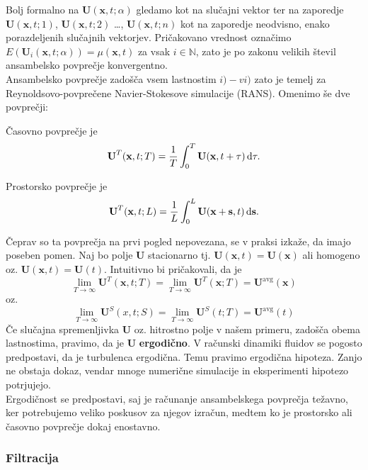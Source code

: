 \documentclass[mat2, tisk]{fmfdelo}
\newcommand{\N}{\mathbb N}
\newcommand{\bd}{\textbf}
\begin{document}
Bolj formalno na $\bd{U}(\bd{x}, t;\alpha)$ gledamo kot na slučajni vektor ter na zaporedje 
$\bd{U}(\bd{x}, t; 1)$, $\bd{U}(\bd{x}, t; 2)$ \dots, $\bd{U}(\bd{x}, t;n)$ kot na zaporedje neodvisno, enako porazdeljenih 
slučajnih vektorjev. Pričakovano vrednost označimo $E(\bd{U}_i(\bd{x}, t; \alpha)) = \mu(\bd{x}, t)$ za vsak $i\in\N$, zato je po 
zakonu velikih števil ansambelsko povprečje konvergentno.\\

Ansambelsko povprečje zadošča vsem lastnostim $i) - vi)$ zato je temelj za \\
Reynoldsovo-povprečene Navier-Stokesove simulacije (RANS). Omenimo še dve povprečji: 
\begin{definicija}
Časovno povprečje je 
\begin{equation}
\bd{U}^T(\bd{x}, t; T) = \frac{1}{T}\int_0^T \bd{U}(\bd{x}, t + \tau) \dif \tau.
\end{equation}
\end{definicija}

\begin{definicija}
Prostorsko povprečje je 
\begin{equation}
\bd{U}^T(\bd{x}, t; L) = \frac{1}{L}\int_0^L \bd{U}(\bd{x} + \bd{s}, t) \dif \bd{s}.
\end{equation}
\end{definicija}

Čeprav so ta povprečja na prvi pogled nepovezana, se v praksi izkaže, da imajo poseben 
pomen. Naj bo polje $\bd{U}$ stacionarno tj. $\bd{U}(\bd{x}, t) = \bd{U}(\bd{x})$ ali homogeno oz. $\bd{U}(\bd{x}, t) = \bd{U}(t)$.
Intuitivno bi pričakovali, da je 
$$
\lim_{T\rightarrow \infty} \bd{U}^T(\bd{x}, t; T) = \lim_{T\rightarrow \infty} \bd{U}^T(\bd{x}; T) = \bd{U}^\text{avg}(\bd{x})
$$
oz. 
$$
\lim_{T\rightarrow \infty} \bd{U}^S(x, t; S) = \lim_{T\rightarrow \infty} \bd{U}^S(t; T) = \bd{U}^\text{avg}(t)
$$
Če slučajna spremenljivka $\bd{U}$ oz. hitrostno polje v našem primeru, zadošča obema lastnostima, 
pravimo, da je $\bd{U}$ \textbf{ergodično}. V računski dinamiki fluidov se pogosto predpostavi, da je turbulenca ergodična. 
Temu pravimo ergodična hipoteza. Zanjo ne obstaja dokaz, vendar mnoge numerične simulacije in eksperimenti hipotezo potrjujejo. \\
Ergodičnost se predpostavi, saj je računanje ansambelskega povprečja težavno, ker potrebujemo 
veliko poskusov za njegov izračun, medtem ko je prostorsko ali časovno povprečje dokaj 
enostavno.

\subsubsection{Filtracija}
\end{document}

